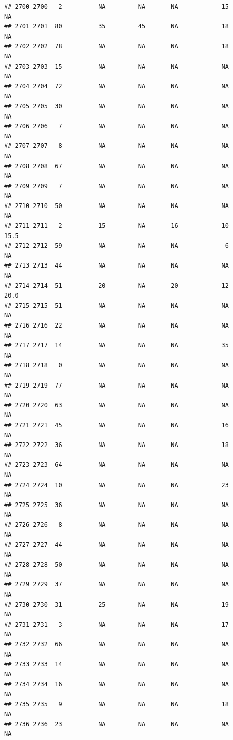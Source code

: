 \documentclass[man]{apa6}
\begin{document}
\begin{verbatim}
## 2700 2700   2          NA         NA       NA            15       NA
## 2701 2701  80          35         45       NA            18       NA
## 2702 2702  78          NA         NA       NA            18       NA
## 2703 2703  15          NA         NA       NA            NA       NA
## 2704 2704  72          NA         NA       NA            NA       NA
## 2705 2705  30          NA         NA       NA            NA       NA
## 2706 2706   7          NA         NA       NA            NA       NA
## 2707 2707   8          NA         NA       NA            NA       NA
## 2708 2708  67          NA         NA       NA            NA       NA
## 2709 2709   7          NA         NA       NA            NA       NA
## 2710 2710  50          NA         NA       NA            NA       NA
## 2711 2711   2          15         NA       16            10     15.5
## 2712 2712  59          NA         NA       NA             6       NA
## 2713 2713  44          NA         NA       NA            NA       NA
## 2714 2714  51          20         NA       20            12     20.0
## 2715 2715  51          NA         NA       NA            NA       NA
## 2716 2716  22          NA         NA       NA            NA       NA
## 2717 2717  14          NA         NA       NA            35       NA
## 2718 2718   0          NA         NA       NA            NA       NA
## 2719 2719  77          NA         NA       NA            NA       NA
## 2720 2720  63          NA         NA       NA            NA       NA
## 2721 2721  45          NA         NA       NA            16       NA
## 2722 2722  36          NA         NA       NA            18       NA
## 2723 2723  64          NA         NA       NA            NA       NA
## 2724 2724  10          NA         NA       NA            23       NA
## 2725 2725  36          NA         NA       NA            NA       NA
## 2726 2726   8          NA         NA       NA            NA       NA
## 2727 2727  44          NA         NA       NA            NA       NA
## 2728 2728  50          NA         NA       NA            NA       NA
## 2729 2729  37          NA         NA       NA            NA       NA
## 2730 2730  31          25         NA       NA            19       NA
## 2731 2731   3          NA         NA       NA            17       NA
## 2732 2732  66          NA         NA       NA            NA       NA
## 2733 2733  14          NA         NA       NA            NA       NA
## 2734 2734  16          NA         NA       NA            NA       NA
## 2735 2735   9          NA         NA       NA            18       NA
## 2736 2736  23          NA         NA       NA            NA       NA

\end{verbatim}
\end{document}
